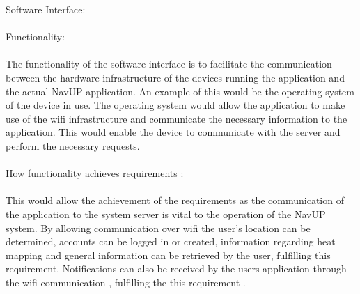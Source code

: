 \documentclass{article}
\begin{document}
{Software Interface:\\\\
Functionality:\\\\
The functionality of the software interface is to facilitate the communication between the hardware infrastructure of the devices running the application and the actual NavUP application. An example of this would be the operating system of the device in use. The operating system would allow the application to make use of the wifi infrastructure and communicate the necessary information to the application. This would enable the device to communicate with the server and perform the necessary requests.\\\\
How functionality achieves requirements :\\\\
This would allow the achievement of the requirements as the communication of the application to the system server is vital to the operation of the NavUP system. By allowing communication over wifi the user's location can be determined, accounts can be logged in or created, information regarding heat mapping and general information can be retrieved by the user, fulfilling this requirement. Notifications can also be received by the users application through the wifi communication , fulfilling the this requirement .}
		
\end{document}

